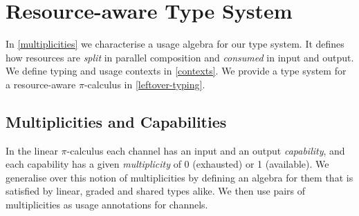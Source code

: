 \documentclass[sigplan,10pt,anonymous,review]{acmart}
\theoremstyle{definition}
\newcommand{\picalc}{$\pi$-calculus}
\begin{document}
\section{Resource-aware Type System}
\label{type-system}

In \autoref{multiplicities} we characterise a usage algebra for our type system.
It defines how resources are \emph{split} in parallel composition and \emph{consumed} in input and output.
We define typing and usage contexts in \autoref{contexts}.
We provide a type system for a resource-aware \picalc{} in \autoref{leftover-typing}.

\subsection{Multiplicities and Capabilities}
\label{multiplicities}

In the linear \picalc{} each channel has an input and an output \emph{capability}, and each capability has a given \emph{multiplicity} of 0 (exhausted) or 1 (available).
We generalise over this notion of multiplicities by defining an algebra for them that is satisfied by linear, graded and shared types alike.
We then use pairs of multiplicities as usage annotations for channels.
\end{document}

